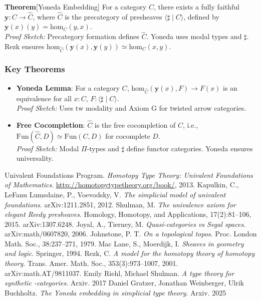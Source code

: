 \documentclass{article}
\begin{document}
\textbf{Theorem}[Yoneda Embedding]
For a category $C$, there exists a fully faithful $\mathbf{y} : C \to \widehat{C}$, where $\widehat{C}$ is the precategory of presheaves $\langle \sharp \mid C \rangle$, defined by $\mathbf{y}(x)(y) = \text{hom}_C(y,x)$. \\
\textit{Proof Sketch:} Precategory formation defines $\widehat{C}$. Yoneda uses modal types and $\sharp$. Rezk ensures $\text{hom}_{\widehat{C}}(\mathbf{y}(x), \mathbf{y}(y)) \simeq \text{hom}_C(x,y)$.

\subsubsection{Key Theorems}
\begin{itemize}
    \item \textbf{Yoneda Lemma}: For a category $C$, $\text{hom}_{\widehat{C}}(\mathbf{y}(x), F) \to F(x)$ is an equivalence for all $x : C$, $F : \langle \sharp \mid C \rangle$. \\
    \textit{Proof Sketch:} Uses $\text{tw}$ modality and Axiom G for twisted arrow categories.
    \item \textbf{Free Cocompletion}: $\widehat{C}$ is the free cocompletion of $C$, i.e., $\text{Fun}(\widehat{C}, D) \simeq \text{Fun}(C, D)$ for cocomplete $D$. \\
    \textit{Proof Sketch:} Modal $\Pi$-types and $\sharp$ define functor categories. Yoneda ensures universality.
\end{itemize}


\begin{thebibliography}{99}
 Univalent Foundations Program. \emph{Homotopy Type Theory: Univalent Foundations of Mathematics}. \url{http://homotopytypetheory.org/book/}, 2013.
 Kapulkin, C., LeFanu Lumsdaine, P., Voevodsky, V. \emph{The simplicial model of univalent foundations}. arXiv:1211.2851, 2012.
 Shulman, M. \emph{The univalence axiom for elegant Reedy presheaves}. Homology, Homotopy, and Applications, 17(2):81--106, 2015. arXiv:1307.6248.
 Joyal, A., Tierney, M. \emph{Quasi-categories vs Segal spaces}. arXiv:math/0607820, 2006.
 Johnstone, P. T. \emph{On a topological topos}. Proc. London Math. Soc., 38:237--271, 1979.
 Mac Lane, S., Moerdijk, I. \emph{Sheaves in geometry and logic}. Springer, 1994.
 Rezk, C. \emph{A model for the homotopy theory of homotopy theory}. Trans. Amer. Math. Soc., 353(3):973--1007, 2001. arXiv:math.AT/9811037.
 Emily Riehl, Michael Shulman. \emph{A type theory for synthetic -categories}. Arxiv. 2017
 Daniel Gratzer, Jonathan Weinberger, Ulrik Buchholtz. \emph{The Yoneda embedding in simplicial type theory}. Arxiv. 2025
\end{thebibliography}
\end{document}

